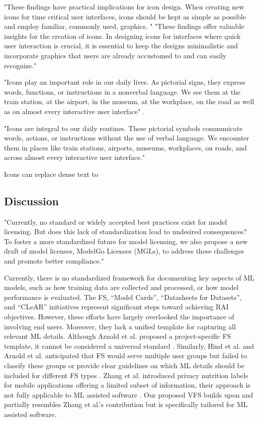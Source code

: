 \documentclass[manuscript,review,anonymous]{acmart}
\begin{document}
	"These findings have practical implications for icon design. When creating new icons for time critical user interfaces, icons should be kept as simple as possible and employ familiar, commonly used, graphics. \cite{doi:10.1177/2041669518780807}"
	"These findings offer valuable insights for the creation of icons. In designing icons for interfaces where quick user interaction is crucial, it is essential to keep the designs minimalistic and incorporate graphics that users are already accustomed to and can easily recognize."

	"Icons play an important role in our daily lives. As pictorial signs, they express words, functions, or instructions in a nonverbal language. We see them at the train station, at the airport, in the museum, at the workplace, on the road as well as on almost every interactive user interface" \cite{COLLAUD2022102290}.

	"Icons are integral to our daily routines. These pictorial symbols communicate words, actions, or instructions without the use of verbal language. We encounter them in places like train stations, airports, museums, workplaces, on roads, and across almost every interactive user interface."

	Icons can replace dense text to

\subsection{Discussion}
	"Currently, no standard or widely accepted best practices exist	for model licensing. But does this lack of standardization lead to undesired consequences? \cite{10.5555/3780338.3783609} To foster a more standardized future	for model licensing, we also propose a new draft of model licenses, ModelGo Licenses (MGLs),
	to address these challenges and promote better compliance."

	Currently, there is no standardized framework for documenting key aspects of ML models, such as how training data are collected and processed, or how model performance is evaluated. The FS, \enquote{Model Cards}, \enquote{Datasheets for Datasets}, and \enquote{CLeAR} initiatives represent significant steps toward achieving RAI objectives. However, these efforts have largely overlooked the importance of involving end users. Moreover, they lack a unified template for capturing all relevant ML details. Although Arnold et al. proposed a project-specific FS template, it cannot be considered a universal standard \cite{arnold_factsheets_2018}.  Similarly, Hind et al. and Arnold et al. anticipated that FS would serve multiple user groups but failed to classify these groups or provide clear guidelines on which ML details should be included for different FS types \cite{arnold_factsheets_2018, hind_experiences_2020}. Zhang et al. introduced privacy nutrition labels for mobile applications offering a limited subset of information, their approach is not fully applicable to ML assisted software \cite{298912}. Our proposed VFS builds upon and partially resembles Zhang et al.'s contribution but is specifically tailored for ML assisted software.
\end{document}

